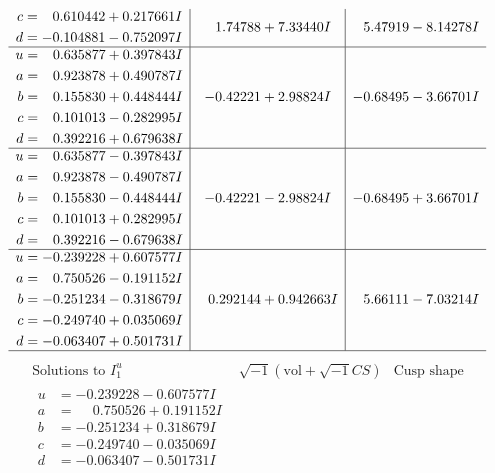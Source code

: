 \documentclass[1p]{elsarticle_modified}
\theoremstyle{definition}
\newcommand{\I}{\sqrt{-1}}
\begin{document}
$$\begin{array}{c|c|c}
\begin{aligned}
c &= \phantom{-}0.610442 + 0.217661 I \\
d &= -0.104881 - 0.752097 I\end{aligned}
 & \phantom{-}1.74788 + 7.33440 I & \phantom{-}5.47919 - 8.14278 I \\ \hline\begin{aligned}
u &= \phantom{-}0.635877 + 0.397843 I \\
a &= \phantom{-}0.923878 + 0.490787 I \\
b &= \phantom{-}0.155830 + 0.448444 I \\
c &= \phantom{-}0.101013 - 0.282995 I \\
d &= \phantom{-}0.392216 + 0.679638 I\end{aligned}
 & -0.42221 + 2.98824 I & -0.68495 - 3.66701 I \\ \hline\begin{aligned}
u &= \phantom{-}0.635877 - 0.397843 I \\
a &= \phantom{-}0.923878 - 0.490787 I \\
b &= \phantom{-}0.155830 - 0.448444 I \\
c &= \phantom{-}0.101013 + 0.282995 I \\
d &= \phantom{-}0.392216 - 0.679638 I\end{aligned}
 & -0.42221 - 2.98824 I & -0.68495 + 3.66701 I \\ \hline\begin{aligned}
u &= -0.239228 + 0.607577 I \\
a &= \phantom{-}0.750526 - 0.191152 I \\
b &= -0.251234 - 0.318679 I \\
c &= -0.249740 + 0.035069 I \\
d &= -0.063407 + 0.501731 I\end{aligned}
 & \phantom{-}0.292144 + 0.942663 I & \phantom{-}5.66111 - 7.03214 I\\
 \hline 
 \end{array}$$\newpage$$\begin{array}{c|c|c}  
\text{Solutions to }I^u_{1}& \I (\text{vol} + \sqrt{-1}CS) & \text{Cusp shape}\\
 \hline 
\begin{aligned}
u &= -0.239228 - 0.607577 I \\
a &= \phantom{-}0.750526 + 0.191152 I \\
b &= -0.251234 + 0.318679 I \\
c &= -0.249740 - 0.035069 I \\
d &= -0.063407 - 0.501731 I\end{aligned}

\end{array}$$
\end{document}
